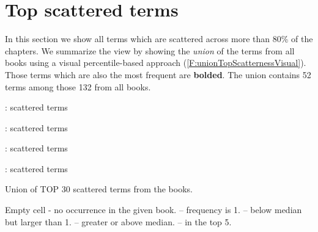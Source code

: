 \section{Top scattered terms}
\label{S:Top30ScatteredTerms}

In this section we show all terms which are scattered across more than 80\% of the chapters.  We summarize the view by showing the \textit{union} of the terms from all books using a visual percentile-based approach (\autoref{F:unionTopScatternessVisual}). Those terms which are also the most frequent are \textbf{bolded}. The union contains 52 terms among those 132 from all books. 

\begin{table*}[h!]
\begin{minipage}[b]{0.5\linewidth}
\centering
    
\caption{\craftTag{}: scattered terms}
\label{T:top30scatteredCraft}
\end{minipage}
\hspace{0.5cm}
\begin{minipage}[b]{0.5\linewidth}
\centering
    
\caption{\lyahTag{}: scattered terms}
\label{T:top30scatteredRWH}
\end{minipage}
\end{table*}

\begin{table*}[h!]
\begin{minipage}[b]{0.5\linewidth}
\centering
    
\caption{\pihTag{}: scattered terms}
\label{T:top30scatteredPIH}
\end{minipage}
\hspace{0.5cm}
\begin{minipage}[b]{0.5\linewidth}
\centering
    
\caption{\rwhTag{}: scattered terms}
\label{T:top30scatteredRWH}
\end{minipage}
\end{table*}

\begin{table}[ht]
\begin{center}
\scalebox{0.8}{
  
}
\caption{Union of TOP 30 scattered terms from the books.}
 Empty cell - no occurrence in the given book. \oneDot{} -- frequency is 1. \belowMdot{} -- below median but larger than 1. \greaterMdot{} -- greater or above median. \topNdot{} -- in the top 5.
\label{F:unionTopScatternessVisual}
\end{center}
\end{table}